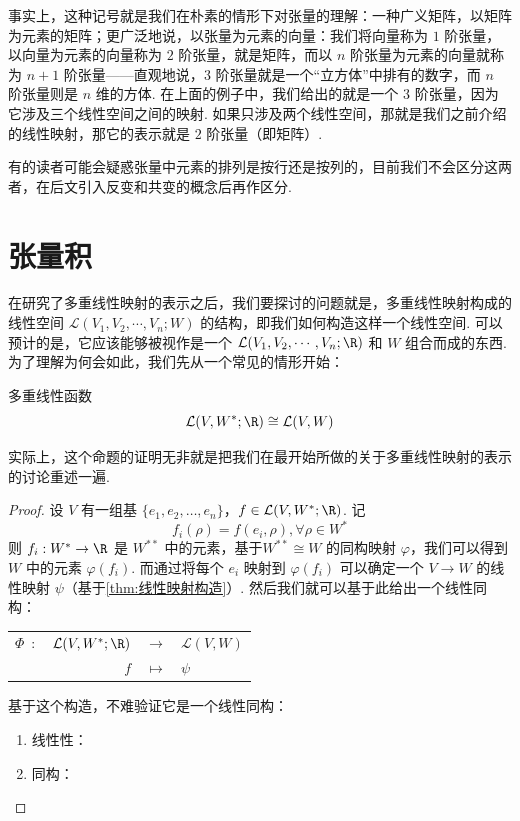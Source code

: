 事实上，这种记号就是我们在朴素的情形下对张量的理解：一种广义矩阵，以矩阵为元素的矩阵；更广泛地说，以张量为元素的向量：我们将向量称为 $1$ 阶张量，以向量为元素的向量称为 $2$ 阶张量，就是矩阵，而以 $n$ 阶张量为元素的向量就称为 $n + 1$ 阶张量——直观地说，$3$ 阶张量就是一个``立方体''中排有的数字，而 $n$ 阶张量则是 $n$ 维的方体. 在上面的例子中，我们给出的就是一个 $3$ 阶张量，因为它涉及三个线性空间之间的映射. 如果只涉及两个线性空间，那就是我们之前介绍的线性映射，那它的表示就是 $2$ 阶张量（即矩阵）.

有的读者可能会疑惑张量中元素的排列是按行还是按列的，目前我们不会区分这两者，在后文引入反变和共变的概念后再作区分.

\section{张量积}

在研究了多重线性映射的表示之后，我们要探讨的问题就是，多重线性映射构成的线性空间 $\mathcal{L}(V_1, V_2, \cdots, V_n; W)$ 的结构，即我们如何构造这样一个线性空间. 可以预计的是，它应该能够被视作是一个 $\mathcal{L}(V_1, V_2, \cdots, V_n; \R)$ 和 $W$ 组合而成的东西. 为了理解为何会如此，我们先从一个常见的情形开始：

\begin{lemma}{}{多重线性函数}
    \[
    \mathcal{L}(V, W^*; \R) \cong \mathcal{L}(V, W)
    \]
\end{lemma}

实际上，这个命题的证明无非就是把我们在最开始所做的关于多重线性映射的表示的讨论重述一遍.

\begin{proof}
    设 $V$ 有一组基 $\{e_1, e_2, \ldots, e_n\}$，$f \in \mathcal{L}(V, W^*; \R)$. 记
    \[
    f_i (\rho) = f(e_i, \rho), \forall \rho \in W^*
    \]
    则 $f_i: W^* \to \R$ 是 $W^{**}$ 中的元素，基于$W^{**} \cong W$ 的同构映射 $\varphi$，我们可以得到 $W$ 中的元素 $\varphi(f_i)$. 而通过将每个 $e_i$ 映射到 $\varphi(f_i)$ 可以确定一个 $V \to W$ 的线性映射 $\psi$（基于\autoref{thm:线性映射构造}）. 然后我们就可以基于此给出一个线性同构：
    \begin{center}
        \begin{tabular}{rrcl}
            $\Phi\enspace\colon$      & $\mathcal{L}(V, W^*; \R)$ & $\to$     & $\mathcal{L}(V, W)$ \\
                                   & $f$                      & $\mapsto$ & $\psi$
        \end{tabular}
    \end{center}

    基于这个构造，不难验证它是一个线性同构：
    \begin{enumerate}
        \item 线性性：
        \item 同构：
    \end{enumerate}
\end{proof}

